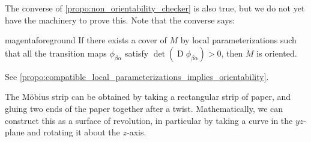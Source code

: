 \documentclass[notoc,notitlepage]{tufte-book}
\DeclareMathOperator{\D}{D}
\begin{document}
\begin{note}
  The converse of \cref{propo:non_orientability_checker} is also true, but we do
  not yet have the machinery to prove this. Note that the converse says:
  \begin{quotebox}{magenta}{foreground}
    If there exists a cover of $M$ by local parameterizations such that all the
    transition maps $\phi_{\beta\alpha}$ satisfy $\det(\D \phi_{\beta\alpha}) >
    0$, then $M$ is oriented.
  \end{quotebox}
  See \cref{propo:compatible_local_parameterizations_implies_orientability}.
\end{note}

\begin{eg}\label{eg:mobius_strip_is_non_orientable}
  The M\"{o}bius strip can be obtained by taking a rectangular strip of paper,
  and gluing two ends of the paper together after a twist. Mathematically, we
  can construct this as a surface of revolution, in particular by taking a curve
  in the $yz$-plane and rotating it about the $z$-axis.


\end{eg}
\end{document}
